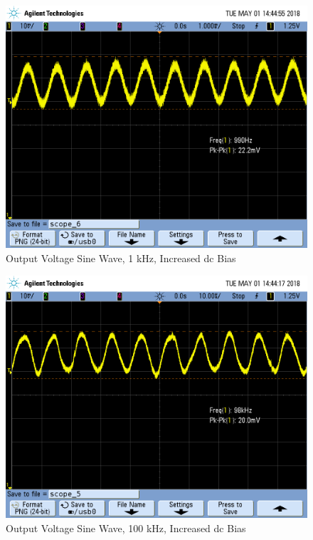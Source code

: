 \begin{figure}[h!]
	\centering
	\includegraphics[scale=0.3]{./images/SCOPE_6.PNG}
	\caption{Output Voltage Sine Wave, 1 \si{\kilo\hertz}, Increased dc Bias}
	\label{fig:1khz_original}
\end{figure}

\FloatBarrier

\begin{figure}[h!]
	\centering
	\includegraphics[scale=0.3]{./images/SCOPE_5.PNG}
	\caption{Output Voltage Sine Wave, 100 \si{\kilo\hertz}, Increased dc Bias}
	\label{fig:100khz_original}
\end{figure}


